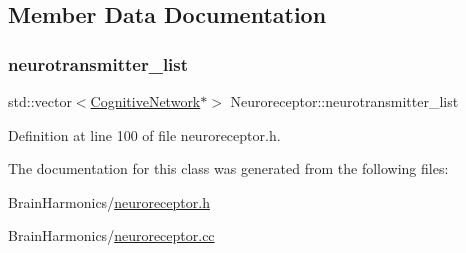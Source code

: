 \subsection{Member Data Documentation}
\mbox{\label{class_neuroreceptor_aeb769732421531614a47bcab8ae21f8e}} 
\subsubsection{\texorpdfstring{neurotransmitter\+\_\+list}{neurotransmitter\_list}}
{\footnotesize\ttfamily std\+::vector$<$\hyperlink{class_cognitive_network}{Cognitive\+Network}$\ast$$>$ Neuroreceptor\+::neurotransmitter\+\_\+list\hspace{0.3cm}{\ttfamily [protected]}}



Definition at line 100 of file neuroreceptor.\+h.



The documentation for this class was generated from the following files\+:\begin{DoxyCompactItemize}
\item 
Brain\+Harmonics/\hyperlink{neuroreceptor_8h}{neuroreceptor.\+h}\item 
Brain\+Harmonics/\hyperlink{neuroreceptor_8cc}{neuroreceptor.\+cc}\end{DoxyCompactItemize}
